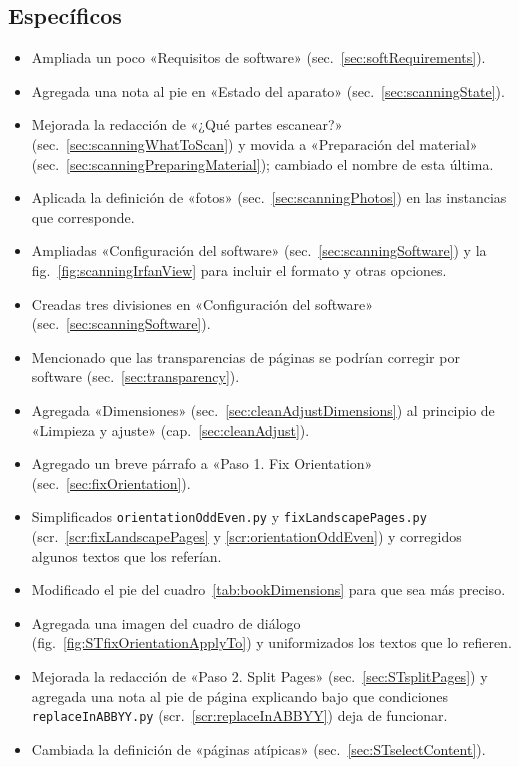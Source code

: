 \documentclass[%
	a5paper,
	10pt,
	twoside,
	openright,
	final,
]{memoir}
\begin{document}
{	\subsection{Específicos}
	\begin{itemize}
		\item Ampliada un poco «Requisitos de software» (sec.~\ref{sec:softRequirements}).
		\item Agregada una nota al pie en «Estado del aparato» (sec.~\ref{sec:scanningState}).
		\item Mejorada la redacción de «¿Qué partes escanear?» (sec.~\ref{sec:scanningWhatToScan}) y movida a «Preparación del material» (sec.~\ref{sec:scanningPreparingMaterial}); cambiado el nombre de esta última.
		\item Aplicada la definición de «fotos» (sec.~\ref{sec:scanningPhotos}) en las instancias que corresponde.
		\item Ampliadas «Configuración del software» (sec.~\ref{sec:scanningSoftware}) y la fig.~\ref{fig:scanningIrfanView} para incluir el formato \png y otras opciones.
		\item Creadas tres divisiones en «Configuración del software» (sec.~\ref{sec:scanningSoftware}).
		\item Mencionado que las transparencias de páginas se podrían corregir por software (sec.~\ref{sec:transparency}).
		\item Agregada «Dimensiones» (sec.~\ref{sec:cleanAdjustDimensions}) al principio de «Limpieza y ajuste» (cap.~\ref{sec:cleanAdjust}).
		\item Agregado un breve párrafo a «Paso 1. Fix Orientation» (sec.~\ref{sec:fixOrientation}).
		\item Simplificados \texttt{orientationOddEven.py} y \texttt{fixLandscapePages.py} (scr.~\ref{scr:fixLandscapePages} y \ref{scr:orientationOddEven}) y corregidos algunos textos que los referían.
		\item Modificado el pie del cuadro~\ref{tab:bookDimensions} para que sea más preciso.
		\item Agregada una imagen del cuadro de diálogo  (fig.~\ref{fig:STfixOrientationApplyTo}) y uniformizados los textos que lo refieren.
		\item Mejorada la redacción de «Paso 2. Split Pages» (sec.~\ref{sec:STsplitPages}) y agregada una nota al pie de página explicando bajo que condiciones \texttt{replaceInABBYY.py} (scr.~\ref{scr:replaceInABBYY}) deja de funcionar.
		\item Cambiada la definición de «páginas atípicas» (sec.~\ref{sec:STselectContent}).

\end{itemize}}
\end{document}
